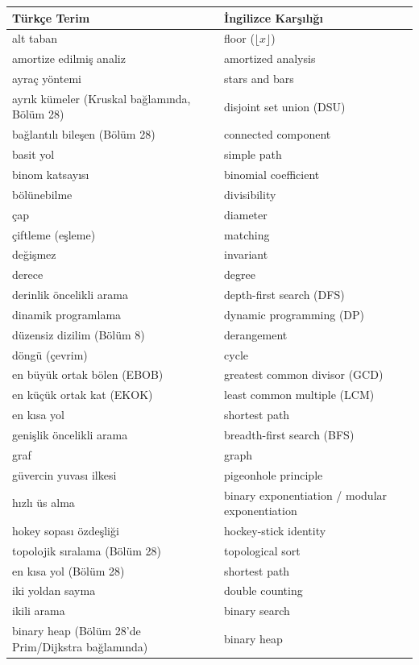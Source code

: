 \begin{center}
\footnotesize
\begin{tabular}{p{} p{}}
\hline
\textbf{Türkçe Terim} & \textbf{İngilizce Karşılığı} \\
\hline
alt taban & floor ($\lfloor x \rfloor$) \\
amortize edilmiş analiz & amortized analysis \\
ayraç yöntemi & stars and bars \\
ayrık kümeler (Kruskal bağlamında, Bölüm 28) & disjoint set union (DSU) \\
bağlantılı bileşen (Bölüm 28) & connected component \\
basit yol & simple path \\
binom katsayısı & binomial coefficient \\
bölünebilme & divisibility \\
çap & diameter \\
çiftleme (eşleme) & matching \\
değişmez & invariant \\
derece & degree \\
derinlik öncelikli arama & depth-first search (DFS) \\
dinamik programlama & dynamic programming (DP) \\
düzensiz dizilim (Bölüm 8) & derangement \\
döngü (çevrim) & cycle \\
en büyük ortak bölen (EBOB) & greatest common divisor (GCD) \\
en küçük ortak kat (EKOK) & least common multiple (LCM) \\
en kısa yol & shortest path \\
genişlik öncelikli arama & breadth-first search (BFS) \\
graf & graph \\
güvercin yuvası ilkesi & pigeonhole principle \\
hızlı üs alma & binary exponentiation / modular exponentiation \\
hokey sopası özdeşliği & hockey-stick identity \\
topolojik sıralama (Bölüm 28) & topological sort \\
en kısa yol (Bölüm 28) & shortest path \\
iki yoldan sayma & double counting \\
ikili arama & binary search \\
binary heap (Bölüm 28'de Prim/Dijkstra bağlamında) & binary heap \\

\end{tabular}
\end{center}
